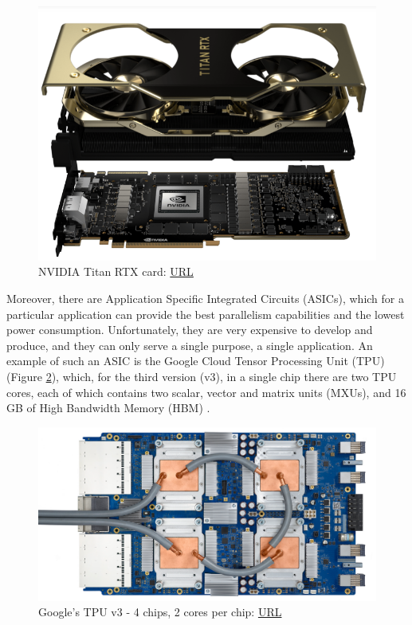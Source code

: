 \begin{figure} [h]
	\centering
	\includegraphics[width=\textwidth]{Images/Hardware/NVIDIA-Titan-RTX.png}
	\decoRule
	\caption[NVIDIA Titan RTX card]{NVIDIA Titan RTX card: \href{https://www.nvidia.com/en-us/deep-learning-ai/products/titan-rtx/}{URL}}
	\label{fig:nvidia-titan-rtx-explosion-view}
\end{figure}

Moreover, there are Application Specific Integrated Circuits (ASICs), which for a particular application can provide the best parallelism capabilities and the lowest power consumption. Unfortunately, they are very expensive to develop and produce, and they can only serve a single purpose, a single application. An example of such an ASIC is the Google Cloud Tensor Processing Unit (TPU) (Figure \ref{fig:google-tpu-motherboard}), which, for the third version (v3), in a single chip there are two TPU cores, each of which contains two scalar, vector and matrix units (MXUs), and 16 GB of High Bandwidth Memory (HBM) \cite{Google-Cloud-TPU}.

\begin{figure} [h]
	\centering
	\includegraphics[width=\textwidth]{Images/Hardware/tpu-v3.png}
	\decoRule
	\caption[Google's TPU v3]{Google's TPU v3 - 4 chips, 2 cores per chip: \href{https://cloud.google.com/tpu/docs/system-architecture}{URL}}
	\label{fig:google-tpu-motherboard}
\end{figure}

